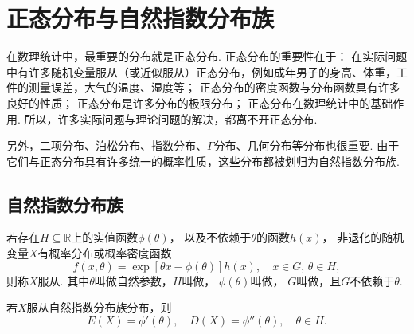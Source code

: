 \chapter{正态分布与自然指数分布族}

在数理统计中，最重要的分布就是正态分布.
正态分布的重要性在于：
在实际问题中有许多随机变量服从（或近似服从）正态分布，例如成年男子的身高、体重，工件的测量误差，大气的温度、湿度等；
正态分布的密度函数与分布函数具有许多良好的性质；
正态分布是许多分布的极限分布；
正态分布在数理统计中的基础作用.
所以，许多实际问题与理论问题的解决，都离不开正态分布.

另外，二项分布、泊松分布、指数分布、\(\Gamma\)分布、几何分布等分布也很重要.
由于它们与正态分布具有许多统一的概率性质，这些分布都被划归为自然指数分布族.

\section{自然指数分布族}
\begin{definition}
若存在\(H \subseteq \mathbb{R}\)上的实值函数\(\phi(\theta)\)，
以及不依赖于\(\theta\)的函数\(h(x)\)，
非退化的随机变量\(X\)有概率分布或概率密度函数\[
f(x,\theta) = \exp[\theta x - \phi(\theta)] h(x),
\quad x \in G,\,\theta \in H,
\]则称\(X\)服从.
其中\(\theta\)叫做自然参数，\(H\)叫做，
\(\phi(\theta)\)叫做，
\(G\)叫做，且\(G\)不依赖于\(\theta\).
\end{definition}

\begin{theorem}
若\(X\)服从自然指数分布族分布，则\[
E(X) = \phi'(\theta),
\quad
D(X) = \phi''(\theta),
\quad
\theta \in H.
\]
\end{theorem}

